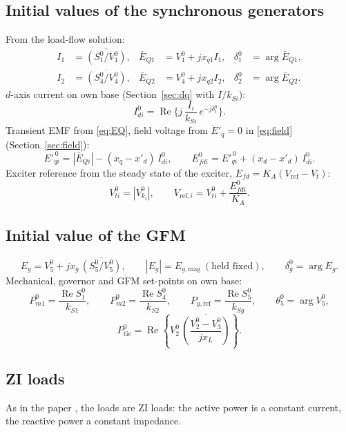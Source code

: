 \documentclass[11pt,a4paper]{article}
\numberwithin{equation}{section}
\newcommand{\cj}[1]{\overline{#1}}
\newcommand{\re}{\operatorname{Re}}
\begin{document}
\subsection{Initial values of the synchronous generators}
From the load-flow solution:
\begin{align}
I_1 &= \cj{(S_1^0/V_1^0)}, & \bar E_{Q1} &= V_1^0 + jx_{q1}I_1, & \delta_1^0 &= \arg\bar E_{Q1},\\
I_2 &= \cj{(S_4^0/V_4^0)}, & \bar E_{Q2} &= V_4^0 + jx_{q2}I_2, & \delta_2^0 &= \arg\bar E_{Q2}.
\end{align}
$d$-axis current on own base (Section~\ref{sec:dq} with $I/k_{Si}$):
\begin{equation}
I_{di}^0 = \re\Big\{ j\,\frac{I_i}{k_{Si}}\,e^{-j\delta_i^0}\Big\}.
\end{equation}
Transient EMF from \eqref{eq:EQ}, field voltage from $\dot E'_q = 0$ in \eqref{eq:field} (Section~\ref{sec:field}):
\begin{equation}
E'^{\,0}_{qi} = |\bar E_{Qi}| - (x_q - x'_d)\,I_{di}^0,\qquad
E_{fdi}^0 = E'^{\,0}_{qi} + (x_d - x'_d)\,I_{di}^0 .
\end{equation}
Exciter reference from the steady state of the exciter, $E_{fd} = K_A(V_{\text{ref}} - V_t)$:
\begin{equation}
V_{ti}^0 = |V_{k_i}^0|,\qquad V_{\text{ref},i} = V_{ti}^0 + \frac{E_{fdi}^0}{K_A}.
\end{equation}

\subsection{Initial value of the GFM}
\begin{equation}
E_g = V_5^0 + jx_g\,\cj{(S_5^0/V_5^0)},\qquad |E_g| = E_{g,\text{mag}}\ (\text{held fixed}),\qquad \delta_g^0 = \arg E_g .
\end{equation}
Mechanical, governor and GFM set-points on own base:
\begin{equation}
P_{m1}^0 = \frac{\re S_1^0}{k_{S1}},\qquad
P_{m2}^0 = \frac{\re S_4^0}{k_{S2}},\qquad
P_{g,\text{ref}} = \frac{\re S_5^0}{k_{Sg}},\qquad
\theta_5^0 = \arg V_5^0,
\end{equation}
\begin{equation}
P_{\text{tie}}^0 = \re\!\left\{V_2^0\,\cj{\left(\frac{V_2^0-V_3^0}{jx_L}\right)}\right\}.
\end{equation}

\subsection{ZI loads}
As in the paper \cite{RA2021access}, the loads are ZI loads: the active power is a constant current, the reactive power a constant impedance.
\end{document}
